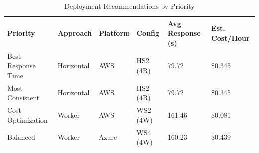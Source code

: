 \begin{table}[!htbp]
\centering
\caption{Deployment Recommendations by Priority}
\label{tab:deployment_recs}
\begin{tabular}{llllll}
\toprule
\textbf{Priority} & \textbf{Approach} & \textbf{Platform} & \textbf{Config} & \textbf{Avg Response (s)} & \textbf{Est. Cost/Hour} \\
\midrule
Best Response Time & Horizontal & AWS & HS2 (4R) & 79.72 & \$0.345 \\
Most Consistent & Horizontal & AWS & HS2 (4R) & 79.72 & \$0.345 \\
Cost Optimization & Worker & AWS & WS2 (4W) & 161.46 & \$0.081 \\
Balanced & Worker & Azure & WS4 (4W) & 160.23 & \$0.439 \\
\bottomrule
\end{tabular}
\end{table}


